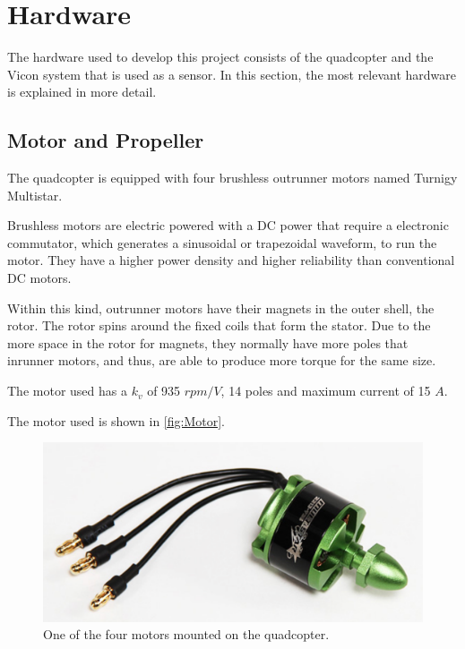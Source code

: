 \section{Hardware}\label{sec:hardware}
The hardware used to develop this project consists of the quadcopter and the Vicon system that is used as a sensor. In this section, the most relevant hardware is explained in more detail. \cite{YDing}

\subsection{Motor and Propeller}
The quadcopter is equipped with four brushless outrunner motors named Turnigy Multistar. 

Brushless motors are electric powered with a DC power that require a electronic commutator, which generates a sinusoidal or trapezoidal waveform, to run the motor. They have a higher power density and higher reliability than conventional DC motors.

Within this kind, outrunner motors have their magnets in the outer shell, the rotor. The rotor spins around the fixed coils that form the stator. Due to the more space in the rotor for magnets, they normally have more poles that inrunner motors, and thus, are able to produce more torque for the same size.  

The motor used has a $k_v$ of 935 $rpm/V$, 14 poles and maximum current of 15 $A$. 

The motor used is shown in \autoref{fig:Motor}.
\begin{figure}[H]
	\centering
	\includegraphics[scale=0.5]{figures/motor.png}
	\caption{One of the four motors mounted on the quadcopter.}
	\label{fig:Motor}
\end{figure} 


